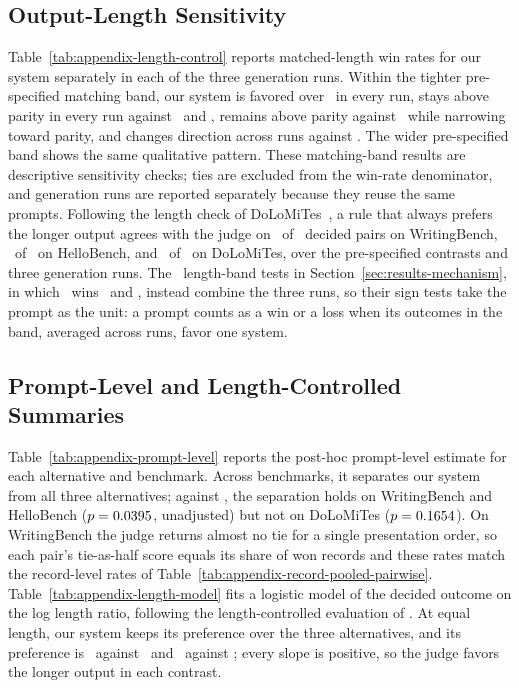\subsection{Output-Length Sensitivity}
\label{app:length-control}
Table~\ref{tab:appendix-length-control} reports matched-length win rates for our system separately in each of the three generation runs.
Within the tighter pre-specified matching band, our system is favored over \condSinglePass\ in every run, stays above parity in every run against \condStaged\ and \condFixedOrder, remains above parity against \condTaskPlanning\ while narrowing toward parity, and changes direction across runs against \condNoGoals.
The wider pre-specified band shows the same qualitative pattern.
These matching-band results are descriptive sensitivity checks; ties are excluded from the win-rate denominator, and generation runs are reported separately because they reuse the same prompts.
Following the length check of DoLoMiTes~\citep{malaviya2025dolomites}, a rule that always prefers the longer output agrees with the judge on \LengthRuleWritingRate\ of \LengthRuleWritingPairs\ decided pairs on WritingBench, \LengthRuleHelloRate\ of \LengthRuleHelloPairs\ on HelloBench, and \LengthRuleDoLoRate\ of \LengthRuleDoLoPairs\ on DoLoMiTes, over the pre-specified contrasts and three generation runs.
The \condSingleWriter\ length-band tests in Section~\ref{sec:results-mechanism}, in which \condSingleWriter\ wins \SingleWriterLengthFiveRate\ and \SingleWriterLengthTenRate, instead combine the three runs, so their sign tests take the prompt as the unit: a prompt counts as a win or a loss when its outcomes in the band, averaged across runs, favor one system.


\subsection{Prompt-Level and Length-Controlled Summaries}
\label{app:prompt-level}
Table~\ref{tab:appendix-prompt-level} reports the post-hoc prompt-level estimate for each alternative and benchmark.
Across benchmarks, it separates our system from all three alternatives; against \condStaged, the separation holds on WritingBench and HelloBench ($p=0.0395$, unadjusted) but not on DoLoMiTes ($p=0.1654$).
On WritingBench the judge returns almost no tie for a single presentation order, so each pair's tie-as-half score equals its share of won records and these rates match the record-level rates of Table~\ref{tab:appendix-record-pooled-pairwise}.
Table~\ref{tab:appendix-length-model} fits a logistic model of the decided outcome on the log length ratio, following the length-controlled evaluation of \citet{dubois2024length}.
At equal length, our system keeps its preference over the three alternatives, and its preference is \LengthModelFullNoGoalsPreference\ against \condNoGoals\ and \LengthModelFullFixedOrderPreference\ against \condFixedOrder; every slope is positive, so the judge favors the longer output in each contrast.


